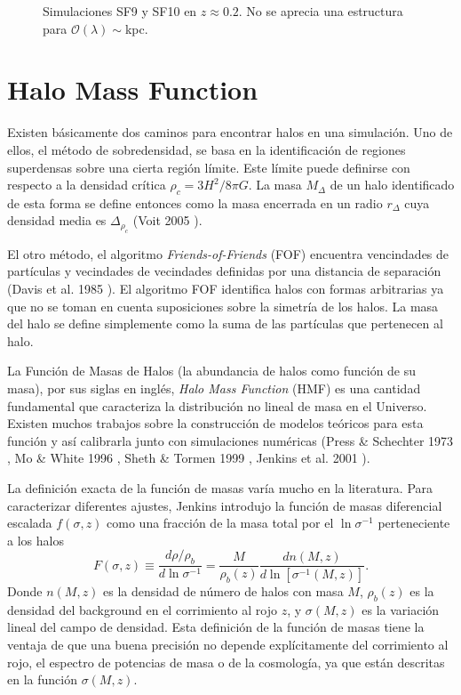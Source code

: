 \documentclass[a4paper,openright,12pt]{book}
\begin{document}
\begin{figure}
\centering
{}
\caption{\footnotesize{Simulaciones SF9 y SF10 en $z\approx0.2$. No se aprecia una estructura para $\mathcal{O}(\lambda)\sim$kpc.}}\label{Fig 4.9}
\end{figure}


\section{Halo Mass Function}
Existen básicamente dos caminos para encontrar halos en una simulación. Uno de ellos, el método de sobredensidad, se basa en la identificación de regiones superdensas sobre una cierta región límite. Este límite puede definirse con respecto a la densidad crítica $\rho_{c} = 3H^{2}/ 8\pi G$. La masa $M_{\Delta}$ de un halo identificado de esta forma se define entonces como la masa encerrada en un radio $r_{\Delta}$ cuya densidad media es $\Delta_{\rho_{c}}$ (Voit 2005 \cite{4.4.1}).

El otro método, el algoritmo \textit{Friends-of-Friends} (FOF) encuentra vencindades de partículas y vecindades de vecindades definidas por una distancia de separación (Davis et al. 1985 \cite{4.4}). El algoritmo FOF identifica halos con formas arbitrarias ya que no se toman en cuenta suposiciones sobre la simetría de los halos. La masa del halo se define simplemente como la suma  de las partículas que pertenecen al halo.
 

La Función de Masas de Halos (la abundancia de halos como función de su masa), por sus siglas en inglés, \textit{Halo Mass Function} (HMF) es una cantidad fundamental que caracteriza la distribución no lineal de masa en el Universo. Existen muchos trabajos sobre la construcción de modelos teóricos para esta función y así calibrarla junto con simulaciones numéricas (Press \& Schechter 1973 \cite{4.4.2}, Mo \& White 1996 \cite{4.4.3}, Sheth \& Tormen 1999 \cite{4.4.4}, Jenkins et al. 2001 \cite{4.4.5}). 

La definición exacta de la función de masas varía mucho en la literatura. Para caracterizar diferentes ajustes, Jenkins introdujo la función de masas diferencial escalada  $f(\sigma, z)$ como una fracción de la masa total por el $\ln \sigma^{-1}$ perteneciente a los halos
\begin{equation}
F(\sigma, z) \equiv \frac{d \rho/\rho_{b}}{d \ln \sigma^{-1}}
=
\frac{M}{\rho_{b}(z)}\frac{d n(M,z)}{d\ln[\sigma^{-1}(M,z)]}.
\end{equation}
Donde $n(M,z)$ es la densidad de número de halos con masa $M$, $\rho_{b}(z)$ es la densidad del background en el corrimiento al rojo $z$, y $\sigma(M,z)$ es la variación lineal del campo de densidad. Esta definición de la función de masas tiene la ventaja de que una buena precisión no depende explícitamente del corrimiento al rojo, el espectro de potencias de masa o de la cosmología, ya que están descritas en la función $\sigma(M,z)$.
\end{document}

